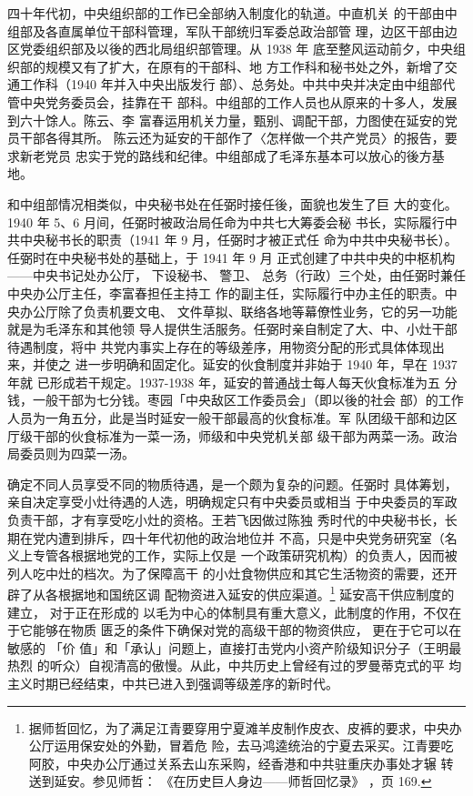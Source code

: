 四十年代初，中央组织部的工作已全部纳入制度化的轨道。中直机关
的干部由中组部及各直属单位干部科管理，军队干部统归军委总政治部管
理，边区干部由边区党委组织部及以後的西北局组织部管理。从 1938 年
底至整风运动前夕，中央组织部的规模又有了扩大，在原有的干部科、地
方工作科和秘书处之外，新增了交通工作科（1940 年并入中央出版发行
部）、总务处。中共中央并决定由中组部代管中央党务委员会，挂靠在干
部科。中组部的工作人员也从原来的十多人，发展到六十馀人。陈云、李
富春运用机关力量，甄别、调配干部，力图使在延安的党员干部各得其所。
陈云还为延安的干部作了〈怎样做一个共产党员〉的报告，要求新老党员
忠实于党的路线和纪律。中组部成了毛泽东基本可以放心的後方基地。

和中组部情况相类似，中央秘书处在任弼时接任後，面貌也发生了巨
大的变化。1940 年 5、6 月间，任弼时被政治局任命为中共七大筹委会秘
书长，实际履行中共中央秘书长的职责（1941 年 9 月，任弼时才被正式任
命为中共中央秘书长）。任弼时在中央秘书处的基础上，于 1941 年 9 月
正式创建了中共中央的中枢机构——中央书记处办公厅，
下设秘书、
警卫、
总务（行政）三个处，由任弼时兼任中央办公厅主任，李富春担任主持工
作的副主任，实际履行中办主任的职责。中央办公厅除了负责机要文电、
文件草拟、联络各地等幕僚性业务，它的另一功能就是为毛泽东和其他领
导人提供生活服务。任弼时亲自制定了大、中、小灶干部待遇制度，将中
共党内事实上存在的等级差序，用物资分配的形式具体体现出来，并使之
进一步明确和固定化。延安的伙食制度并非始于 1940 年，早在 1937 年就
已形成若干规定。1937-1938 年，延安的普通战士每人每天伙食标准为五
分钱，一般干部为七分钱。枣园「中央敌区工作委员会」（即以後的社会
部）的工作人员为一角五分，此是当时延安一般干部最高的伙食标准。军
队团级干部和边区厅级干部的伙食标准为一菜一汤，师级和中央党机关部
级干部为两菜一汤。政治局委员则为四菜一汤。

确定不同人员享受不同的物质待遇，是一个颇为复杂的问题。任弼时
具体筹划，亲自决定享受小灶待遇的人选，明确规定只有中央委员或相当
于中央委员的军政负责干部，才有享受吃小灶的资格。王若飞因做过陈独
秀时代的中央秘书长，长期在党内遭到排斥，四十年代初他的政治地位并
不高，只是中央党务研究室（名义上专管各根据地党的工作，实际上仅是
一个政策研究机构）的负责人，因而被列人吃中灶的档次。为了保障高干
的小灶食物供应和其它生活物资的需要，还开辟了从各根据地和国统区调
配物资进入延安的供应渠道。\footnote{据师哲回忆，为了满足江青要穿用宁夏滩羊皮制作皮衣、皮裤的要求，中央办公厅运用保安处的外勤，冒着危
险，去马鸿逵统治的宁夏去采买。江青要吃阿胶，中央办公厅通过关系去山东采购，经香港和中共驻重庆办事处才辗
转送到延安。参见师哲：
《在历史巨人身边——师哲回忆录》
，页 169. } 延安高干供应制度的建立，
对于正在形成的
以毛为中心的体制具有重大意义，此制度的作用，不仅在于它能够在物质
匮乏的条件下确保对党的高级干部的物资供应，
更在于它可以在敏感的
「价
值」和「承认」问题上，直接打击党内小资产阶级知识分子（王明最热烈
的听众）自视清高的傲慢。从此，中共历史上曾经有过的罗曼蒂克式的平
均主义时期已经结束，中共已进入到强调等级差序的新时代。

